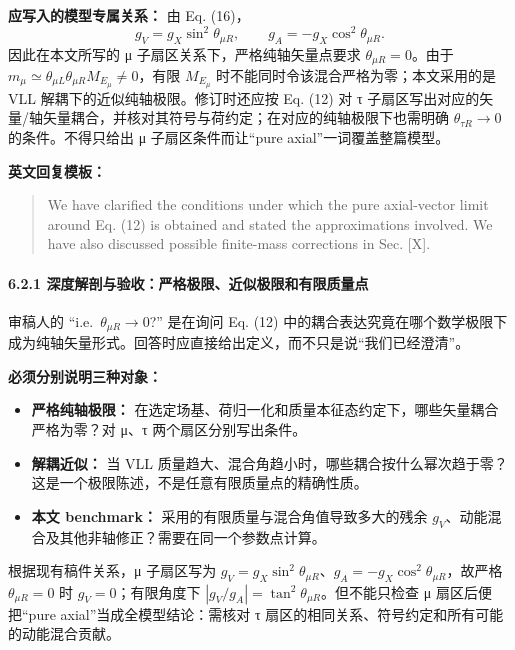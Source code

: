 \documentclass[
]{article}
\providecommand{\tightlist}{%
  \setlength{\itemsep}{0pt}\setlength{\parskip}{0pt}}
\begin{document}
\textbf{应写入的模型专属关系：} 由 Eq. (16)， \[
g_V=g_X\sin^2\theta_{\mu R},\qquad g_A=-g_X\cos^2\theta_{\mu R}.
\] 因此在本文所写的 μ 子扇区关系下，严格纯轴矢量点要求
\(\theta_{\mu R}=0\)。由于
\(m_\mu\simeq\theta_{\mu L}\theta_{\mu R}M_{E_\mu}\neq0\)，有限
\(M_{E_\mu}\) 时不能同时令该混合严格为零；本文采用的是 VLL
解耦下的近似纯轴极限。修订时还应按 Eq. (12) 对 τ
子扇区写出对应的矢量/轴矢量耦合，并核对其符号与荷约定；在对应的纯轴极限下也需明确
\(\theta_{\tau R}\to0\) 的条件。不得只给出 μ 子扇区条件而让``pure
axial''一词覆盖整篇模型。

\textbf{英文回复模板：}

\begin{quote}
We have clarified the conditions under which the pure axial-vector limit
around Eq. (12) is obtained and stated the approximations involved. We
have also discussed possible finite-mass corrections in Sec. {[}X{]}.
\end{quote}

\paragraph{6.2.1
深度解剖与验收：严格极限、近似极限和有限质量点}\label{ux6df1ux5ea6ux89e3ux5256ux4e0eux9a8cux6536ux4e25ux683cux6781ux9650ux8fd1ux4f3cux6781ux9650ux548cux6709ux9650ux8d28ux91cfux70b9}

审稿人的 ``i.e.~\(\theta_{\mu R}\to0\)?'' 是在询问 Eq. (12)
中的耦合表达究竟在哪个数学极限下成为纯轴矢量形式。回答时应直接给出定义，而不只是说``我们已经澄清''。

\textbf{必须分别说明三种对象：}

\begin{itemize}
\tightlist
\item
  \textbf{严格纯轴极限：}
  在选定场基、荷归一化和质量本征态约定下，哪些矢量耦合严格为零？对 μ、τ
  两个扇区分别写出条件。
\item
  \textbf{解耦近似：} 当 VLL
  质量趋大、混合角趋小时，哪些耦合按什么幂次趋于零？这是一个极限陈述，不是任意有限质量点的精确性质。
\item
  \textbf{本文 benchmark：} 采用的有限质量与混合角值导致多大的残余
  \(g_V\)、动能混合及其他非轴修正？需要在同一个参数点计算。
\end{itemize}

根据现有稿件关系，μ 子扇区写为
\(g_V=g_X\sin^2\theta_{\mu R}\)、\(g_A=-g_X\cos^2\theta_{\mu R}\)，故严格
\(\theta_{\mu R}=0\) 时 \(g_V=0\)；有限角度下
\(|g_V/g_A|=\tan^2\theta_{\mu R}\)。但不能只检查 μ 扇区后便把``pure
axial''当成全模型结论：需核对 τ
扇区的相同关系、符号约定和所有可能的动能混合贡献。
\end{document}
